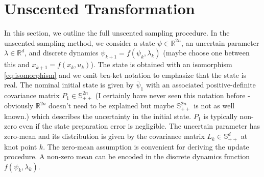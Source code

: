\section{Unscented Transformation}
\label{appendix:unscented}
In this section, we outline the full unscented sampling procedure.
In the unscented sampling method, we consider a state $\psi \in \mathbb{R}^{2n}$, 
an uncertain parameter $\lambda \in \mathbb{R}^{d}$, and discrete dynamics
$\psi_{k + 1} = f(\psi_{k}, \lambda_{k})$ (maybe choose one between this and $x_{k + 1} = f(x_{k}, u_{k})$).
The state is obtained with an isomorphism \eqref{eq:isomorphism} and
we omit bra-ket notation to emphasize that the state is real.
The nominal initial state is given by $\bar{\psi}_{1}$ with an associated
positive-definite covariance matrix $P_{1} \in \mathbb{S}_{++}^{2n}$ (I certainly have never seen this notation before - obviously $\mathbb{R}^{2n}$ doesn't need to be explained but maybe $\mathbb{S}_{++}^{2n}$ is not as well known.)
which describes the uncertainty in the initial state.
$P_{1}$ is typically non-zero even if the state preparation error is negligible.
The uncertain parameter has zero-mean
and its distribution is given by the covariance matrix
$L_{k} \in \mathbb{S}_{++}^{d}$ at knot point $k$. The zero-mean assumption
is convenient for deriving the update procedure. A non-zero mean can be encoded
in the discrete dynamics function $f(\psi_{k}, \lambda_{k})$.

